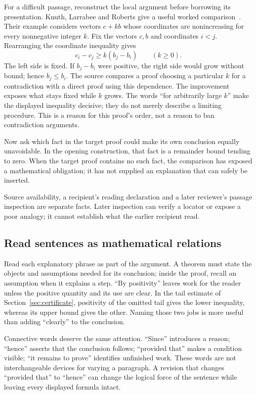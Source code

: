 For a difficult passage, reconstruct the local argument before borrowing its
presentation. Knuth, Larrabee and Roberts give a useful worked
comparison~\cite[\S\S2--3, pp.~7--8]{knuth}. Their example considers vectors
$c+kb$ whose coordinates are nonincreasing for every nonnegative integer $k$.
Fix the vectors $c,b$ and coordinates $i<j$. Rearranging the coordinate
inequality gives
\[
                 c_i-c_j\ge k(b_j-b_i)\qquad(k\ge0).
\]
The left side is fixed. If $b_j-b_i$ were positive, the right side would grow
without bound; hence $b_j\le b_i$. The source compares a proof choosing a
particular $k$ for a contradiction with a direct proof using this dependence.
The improvement exposes what stays fixed while $k$ grows. The words ``for
arbitrarily large $k$'' make the displayed inequality decisive; they do not
merely describe a limiting procedure. This is a reason for this proof's order,
not a reason to ban contradiction arguments.

Now ask which fact in the target proof could make its own conclusion equally
unavoidable. In the opening construction, that fact is a remainder bound tending
to zero. When the target proof contains no such fact, the comparison has exposed
a mathematical obligation; it has not supplied an explanation that can safely
be inserted.

Source availability, a recipient's reading declaration and a later reviewer's
passage inspection are separate facts. Later inspection can verify a locator
or expose a poor analogy; it cannot establish what the earlier recipient read.

\subsection{Read sentences as mathematical relations}

Read each explanatory phrase as part of the argument. A theorem must state
the objects and assumptions needed for its conclusion; inside the proof,
recall an assumption when it explains a step. ``By positivity'' leaves work
for the reader unless the positive quantity and its use are clear. In the
tail estimate of Section~\ref{sec:certificate}, positivity of the omitted
tail gives the lower inequality, whereas its upper bound gives the other.
Naming those two jobs is more useful than adding ``clearly'' to the conclusion.

Connective words deserve the same attention. ``Since'' introduces a reason;
``hence'' asserts that the conclusion follows; ``provided that'' makes a
condition visible; ``it remains to prove'' identifies unfinished work. These
words are not interchangeable devices for varying a paragraph. A revision
that changes ``provided that'' to ``hence'' can change the logical force of
the sentence while leaving every displayed formula intact.

